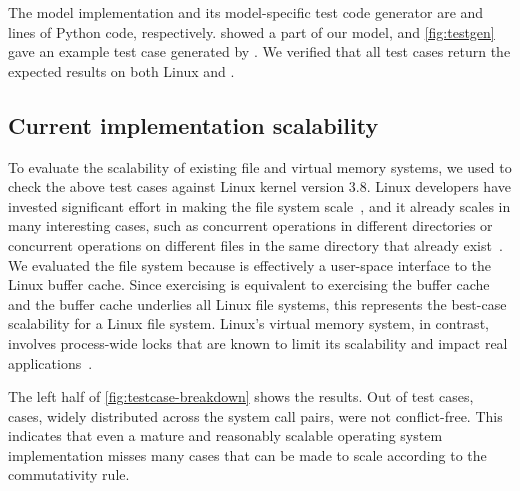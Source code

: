 The model implementation and its model-specific test code generator
are  and
 lines of Python code,
respectively.
 showed a part of our
model, and \cref{fig:testgen} gave an example test
case generated by \tool{}.  We verified that all test cases return
the expected results on both Linux and \sys.

\begin{figure*}
\small
\centering

\caption{
  Scalability for system call pairs, showing the fraction and absolute
  number
  of test cases generated by \tool that are not
  conflict-free for each system call pair.
  One example test case was shown in \cref{fig:testgen}.
}
\label{fig:testcase-breakdown}
\end{figure*}


\subsection{Current implementation scalability}

To evaluate the scalability of existing file and virtual memory systems,
we used \mtrace{} to check the above test cases against
Linux kernel version 3.8.
Linux developers have invested significant effort in making the file
system scale~\cite{boyd-wickizer:scaling}, and it already scales in
many interesting cases, such as concurrent operations in different
directories or concurrent operations on different files in the same
directory that already exist~\cite{lwn:dcache}.
%
We evaluated the  file system because
 is effectively a user-space interface to the Linux buffer
cache.  Since exercising  is equivalent to exercising the
buffer cache and the buffer cache underlies all Linux file
systems, this represents the best-case scalability for a Linux file
system.
%
Linux's virtual memory system, in contrast, involves process-wide
locks that are known to limit its
scalability and impact real
applications~\cite{boyd-wickizer:scaling,clements:bonsai,gil:c4}.

The left half of \cref{fig:testcase-breakdown} shows the results.
Out of  test cases,
 cases, widely distributed across the
system call pairs, were not conflict-free.
This indicates that even a mature and reasonably scalable operating system
implementation misses many cases that can be made to scale according
to the commutativity rule.

